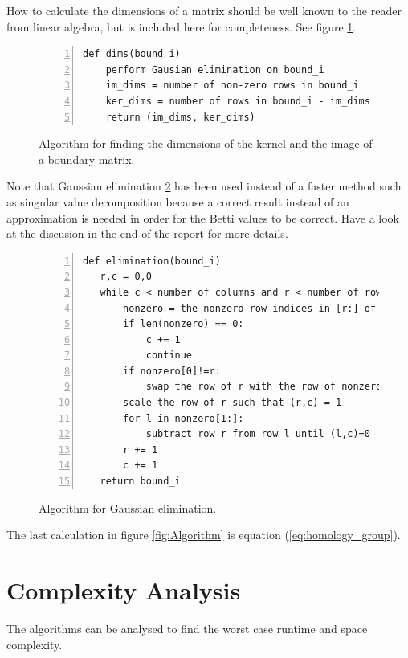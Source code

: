 \documentclass[11pt,a4paper,twoside]{report}
\begin{document}
How to calculate the dimensions of a matrix should be well known to the reader from linear algebra, but is included here for completeness. See figure \ref{fig:Algorithm_dims}.
\begin{figure}[H]
\begin{lstlisting}[numbers=left]
def dims(bound_i)
    perform Gausian elimination on bound_i
    im_dims = number of non-zero rows in bound_i
    ker_dims = number of rows in bound_i - im_dims
    return (im_dims, ker_dims)
\end{lstlisting}
\caption{Algorithm for finding the dimensions of the kernel and the image of a boundary matrix.}
\label{fig:Algorithm_dims}
\end{figure}
Note that Gaussian elimination \ref{fig:Algorithm_gauss} has been used instead of a faster method such as singular value decomposition because a correct result instead of an approximation is needed in order for the Betti values to be correct. Have a look at the discusion in the end of the report for more details.
\begin{figure}[H]
\begin{lstlisting}[numbers=left]
def elimination(bound_i)
   r,c = 0,0
   while c < number of columns and r < number of rows:
       nonzero = the nonzero row indices in [r:] of column c
       if len(nonzero) == 0:
           c += 1
           continue
       if nonzero[0]!=r:
           swap the row of r with the row of nonzero
       scale the row of r such that (r,c) = 1
       for l in nonzero[1:]:
           subtract row r from row l until (l,c)=0
       r += 1
       c += 1
   return bound_i
\end{lstlisting}
\caption{Algorithm for Gaussian elimination.}
\label{fig:Algorithm_gauss}
\end{figure}
The last calculation in figure \ref{fig:Algorithm} is equation (\ref{eq:homology_group}).
\section{Complexity Analysis}
The algorithms can be analysed to find the worst case runtime and space complexity. 
\end{document}

